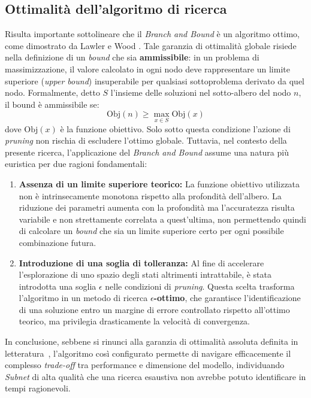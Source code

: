 \subsection{Ottimalità dell'algoritmo di ricerca}
Risulta importante sottolineare che il \textit{Branch and Bound} è un algoritmo
ottimo, come dimostrato da Lawler e Wood \cite{BnBOptim}. Tale garanzia di
ottimalità globale risiede nella definizione di un \textit{bound} che sia
\textbf{ammissibile}: in un problema di massimizzazione, il valore calcolato in
ogni nodo deve rappresentare un limite superiore (\textit{upper bound})
insuperabile per qualsiasi sottoproblema derivato da quel nodo. Formalmente,
detto $S$ l'insieme delle soluzioni nel sotto-albero del nodo $n$, il bound è
ammissibile se:
\begin{equation}
    \text{Obj}(n) \geq \max_{x \in S} \text{Obj}(x)
\end{equation}
dove $\text{Obj}(x)$ è la funzione
obiettivo. Solo sotto questa condizione l'azione di \textit{pruning} non
rischia di escludere l'ottimo globale. Tuttavia, nel contesto della presente
ricerca, l'applicazione del \textit{Branch and Bound} assume una natura più
euristica per due ragioni fondamentali:
\begin{enumerate}
    \item \textbf{Assenza di un limite superiore teorico:} La funzione obiettivo utilizzata non è intrinsecamente monotona rispetto alla profondità dell'albero. La riduzione dei parametri aumenta con la profondità ma l'accuratezza risulta variabile e non strettamente correlata a quest'ultima, non permettendo quindi di calcolare un \textit{bound} che sia un limite superiore certo per ogni possibile combinazione futura.
    \item \textbf{Introduzione di una soglia di tolleranza:} Al fine di accelerare l'esplorazione di uno spazio degli stati altrimenti intrattabile, è stata introdotta una soglia $\epsilon$ nelle condizioni di \textit{pruning}. Questa scelta trasforma l'algoritmo in un metodo di ricerca \textbf{$\epsilon$-ottimo}, che garantisce l'identificazione di una soluzione entro un margine di errore controllato rispetto all'ottimo teorico, ma privilegia drasticamente la velocità di convergenza.
\end{enumerate}
In conclusione, sebbene si rinunci alla garanzia di ottimalità assoluta definita in letteratura~\cite{BnBOptim}, l'algoritmo così configurato permette di navigare efficacemente il complesso \textit{trade-off} tra performance e dimensione del modello, individuando \textit{Subnet} di alta qualità che una ricerca esaustiva non avrebbe potuto identificare in tempi ragionevoli.

